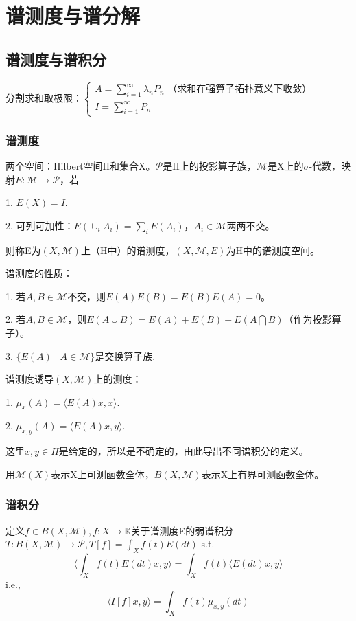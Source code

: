 \section{谱测度与谱分解}

\subsection{谱测度与谱积分}

分割求和取极限：$\left\{\begin{array}{ll}
  A = \sum_{i = 1}^{\infty} \lambda_n P_n \text{ （求和在强算子拓扑意义下收敛）} \\
  I = \sum_{i = 1}^{\infty} P_n
\end{array}\right.$

\subsubsection{谱测度}

两个空间：Hilbert空间H和集合X。$\mathcal{P}$是H上的投影算子族，$\mathcal{M}$是X上的$\sigma$-代数，映射$E: \mathcal{M} \to \mathcal{P}$，若

1. $E(X) = I$.

2. 可列可加性：$E(\cup_i A_i) = \sum_i E(A_i)$，$A_i \in \mathcal{M}$两两不交。

则称E为$(X, \mathcal{M})$上（H中）的谱测度，$(X, \mathcal{M}, E)$为H中的谱测度空间。

谱测度的性质：

1. 若$A, B \in \mathcal{M}$不交，则$E(A) E(B)=E(B) E(A)=0$。

2. 若$A, B \in \mathcal{M}$，则$E(A \cup B)=E(A)+E(B)-E(A \bigcap B)$（作为投影算子）。

3. $\{E(A) \mid A \in \mathcal{M}\}$是交换算子族.

谱测度诱导$(X, \mathcal{M})$上的测度：

1. $\mu_x(A) = \langle E(A)x, x \rangle$.

2. $\mu_{x, y}(A) = \langle E(A)x, y \rangle$.

这里$x, y \in H$是给定的，所以是不确定的，由此导出不同谱积分的定义。

用$\mathcal{M}(X)$表示X上可测函数全体，$B(X, \mathcal{M})$表示X上有界可测函数全体。

\subsubsection{谱积分}

定义$f \in B(X, \mathcal{M}), f: X \to \mathbb{K}$关于谱测度E的弱谱积分$T: B(X, \mathcal{M}) \to \mathcal{P}, T[f] = \int_X f(t) E(dt)$ s.t.
\[
  \langle \int_X f(t) E(dt) x, y \rangle = \int_X f(t) \langle E(dt) x, y \rangle
\]
i.e.,
\[
  \langle I[f]x, y \rangle = \int_X f(t) \mu_{x, y}(dt)
\]

